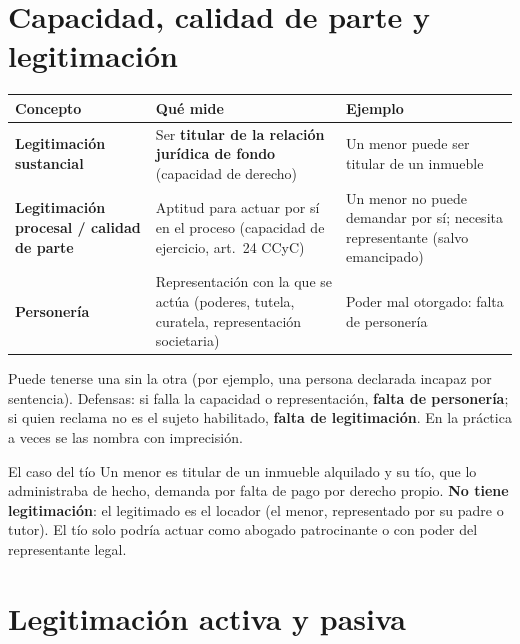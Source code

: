 
\section{Capacidad, calidad de parte y legitimación}

\begin{center}
\begin{tabularx}{\textwidth}{>{\raggedright\arraybackslash}p{3.4cm} Y Y}
\toprule
\textbf{Concepto} & \textbf{Qué mide} & \textbf{Ejemplo} \\
\midrule
\textbf{Legitimación sustancial} & Ser \textbf{titular de la relación jurídica de fondo} (capacidad de derecho) & Un menor puede ser titular de un inmueble \\
\addlinespace
\textbf{Legitimación procesal / calidad de parte} & Aptitud para actuar por sí en el proceso (capacidad de ejercicio, art.\ 24 CCyC) & Un menor no puede demandar por sí; necesita representante (salvo emancipado) \\
\addlinespace
\textbf{Personería} & Representación con la que se actúa (poderes, tutela, curatela, representación societaria) & Poder mal otorgado: falta de personería \\
\bottomrule
\end{tabularx}
\end{center}

Puede tenerse una sin la otra (por ejemplo, una persona declarada incapaz por sentencia). Defensas: si falla la capacidad o representación, \textbf{falta de personería}; si quien reclama no es el sujeto habilitado, \textbf{falta de legitimación}. En la práctica a veces se las nombra con imprecisión.

\begin{example}{El caso del tío}
Un menor es titular de un inmueble alquilado y su tío, que lo administraba de hecho, demanda por falta de pago por derecho propio. \textbf{No tiene legitimación}: el legitimado es el locador (el menor, representado por su padre o tutor). El tío solo podría actuar como abogado patrocinante o con poder del representante legal.
\end{example}

\section{Legitimación activa y pasiva}

